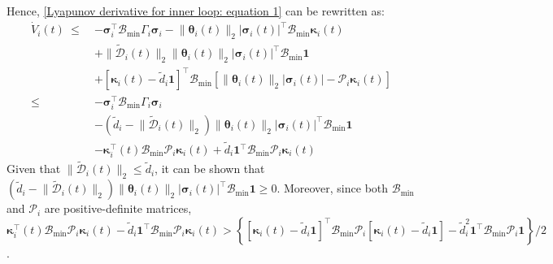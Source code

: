 \documentclass[lettersize,journal]{IEEEtran}
\begin{document}
Hence, \eqref{Lyapunov derivative for inner loop: equation 1} can be rewritten as:
\begin{align}
\label{Lyapunov derivative for inner loop: equation 2}
    \dot{V}_i(t)~{\leq}~& - \boldsymbol{\sigma}_i^{\top} \mathcal{B}_{\text{min}} \Gamma_i \boldsymbol{\sigma}_i - \lVert \boldsymbol{\theta}_i(t) \rVert_2 \lvert \boldsymbol{\sigma}_i(t) \rvert^{\top} \mathcal{B}_{\text{min}} \boldsymbol{\kappa}_i(t) \nonumber \\
    & + \lVert\tilde{\mathcal{D}}_i(t)\rVert_2 \lVert \boldsymbol{\theta}_i(t) \rVert_2 \lvert \boldsymbol{\sigma}_i(t) \rvert^{\top} \mathcal{B}_{\text{min}} \boldsymbol{1} \nonumber \\
    & + \left[\boldsymbol{\kappa}_i(t) - \tilde{d}_{i} \boldsymbol{1}\right]^{\top} \mathcal{B}_{\text{min}} \left[\lVert \boldsymbol{\theta}_i(t) \rVert_2 \lvert \boldsymbol{\sigma}_i(t) \rvert - \mathcal{P}_{i} \boldsymbol{\kappa}_i(t) \right] \nonumber \\
    \leq ~ & - \boldsymbol{\sigma}_i^{\top} \mathcal{B}_{\text{min}} \Gamma_i \boldsymbol{\sigma}_i \nonumber \\
    & - \left( \tilde{d}_{i} - \lVert\tilde{\mathcal{D}}_i(t)\rVert_2 \right) \lVert \boldsymbol{\theta}_i(t) \rVert_2 \lvert \boldsymbol{\sigma}_i(t) \rvert^{\top} \mathcal{B}_{\text{min}} \boldsymbol{1} \nonumber \\
    & - \boldsymbol{\kappa}_i^{\top}(t) \mathcal{B}_{\text{min}} \mathcal{P}_{i} \boldsymbol{\kappa}_i(t) + \tilde{d}_{i} \boldsymbol{1}^{\top} \mathcal{B}_{\text{min}} \mathcal{P}_{i} \boldsymbol{\kappa}_i(t)
\end{align}
Given that $\lVert\tilde{\mathcal{D}}_i(t)\rVert_2 \leq \tilde{d}_i$, it can be shown that $\left( \tilde{d}_{i} - \lVert\tilde{\mathcal{D}}_i(t)\rVert_2 \right) \lVert \boldsymbol{\theta}_i(t) \rVert_2 \lvert \boldsymbol{\sigma}_i(t) \rvert^{\top} \mathcal{B}_{\text{min}} \boldsymbol{1} \geq 0$.
Moreover, since both $\mathcal{B}_{\text{min}}$ and $\mathcal{P}_{i}$ are positive-definite matrices, $\boldsymbol{\kappa}_i^{\top}(t) \mathcal{B}_{\text{min}} \mathcal{P}_{i} \boldsymbol{\kappa}_i(t) - \tilde{d}_{i} \boldsymbol{1}^{\top} \mathcal{B}_{\text{min}} \mathcal{P}_{i} \boldsymbol{\kappa}_i(t) > \left\{\left[\boldsymbol{\kappa}_i(t) - \tilde{d}_{i} \boldsymbol{1}\right]^{\top} \mathcal{B}_{\text{min}} \mathcal{P}_{i} \left[\boldsymbol{\kappa}_i(t) - \tilde{d}_{i} \boldsymbol{1}\right] - \tilde{d}_{i}^2 \boldsymbol{1}^{\top} \mathcal{B}_{\text{min}} \mathcal{P}_{i} \boldsymbol{1} \right\}/2$.
\end{document}
